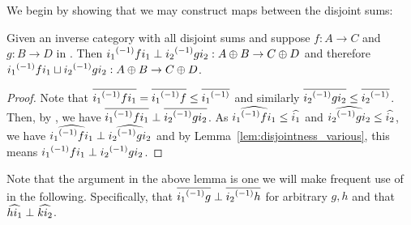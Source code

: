 We begin by showing that we may construct maps between the disjoint sums:
\begin{lemma}\label{lem:disjoint_sum_maps_are_perp}
  Given \X an inverse category with all disjoint sums and suppose $f:A \to C$ and $g:B\to D$ in
  \X. Then  ${i_1}^{(-1)} f i_1 \perp {i_2}^{(-1)} g i_2 : A\oplus B\to C\oplus D$ and therefore
  ${i_1}^{(-1)} f i_1 \sqcup {i_2}^{(-1)} g i_2 : A\oplus B\to C\oplus D$.
\end{lemma}
\begin{proof}
  Note that $\overline{{i_1}^{(-1)} f i_1} = \overline{{i_1}^{(-1)} f} \le \overline{{i_1}^{(-1)}}$ and similarly
  $\overline{{i_2}^{(-1)} g i_2} \le \overline{{i_2}^{(-1)}}$. Then, by , we have
  $\overline{{i_1}^{(-1)} f i_1} \perp \overline{{i_2}^{(-1)} g i_2}$.
  As $\widehat{{i_1}^{(-1)} f i_1} \le \widehat{i_1}$ and  $\widehat{{i_2}^{(-1)} g i_2} \le \widehat{i_2}$, we
  have $\widehat{{i_1}^{(-1)} f i_1} \perp \widehat{{i_2}^{(-1)} g i_2}$ and by
  Lemma~\ref{lem:disjointness_various}, this means  ${i_1}^{(-1)} f i_1\perp {i_2}^{(-1)} g i_2$.
\end{proof}

Note that the argument in the above lemma is one we will make frequent use of in the
following. Specifically, that $\overline{{i_1}^{(-1)} g} \perp \overline{{i_2}^{(-1)} h}$ for arbitrary $g,h$ and
that $\widehat{h i_1} \perp \widehat{k i_2}$.

